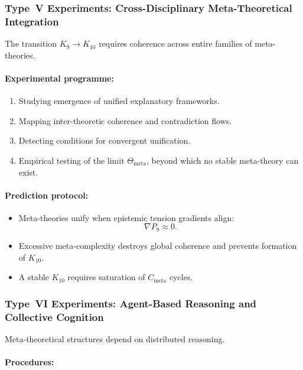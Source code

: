 \subsubsection{Type~V Experiments: Cross-Disciplinary Meta-Theoretical Integration}

The transition $K_9 \to K_{10}$ requires coherence across entire
families of meta-theories.

\paragraph{Experimental programme:}

\begin{enumerate}
    \item Studying emergence of unified explanatory frameworks.
    \item Mapping inter-theoretic coherence and contradiction flows.
    \item Detecting conditions for convergent unification.
    \item Empirical testing of the limit
          $\Theta_{\mathrm{meta}}$, beyond which no stable
          meta-theory can exist.
\end{enumerate}

\paragraph{Prediction protocol:}

\begin{itemize}
    \item Meta-theories unify when epistemic tension gradients align:
          \[
              \nabla P_9 \approx 0.
          \]
    \item Excessive meta-complexity destroys global coherence and
          prevents formation of $K_{10}$.
    \item A stable $K_{10}$ requires saturation of $C_{\mathrm{meta}}$ cycles.
\end{itemize}



\subsubsection{Type~VI Experiments: Agent-Based Reasoning and Collective Cognition}

Meta-theoretical structures depend on distributed reasoning.

\paragraph{Procedures:}


